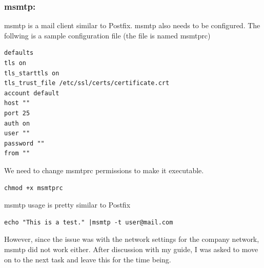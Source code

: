 \subsubsection{msmtp:} msmtp is a mail client similar to Postfix. msmtp also needs to be configured. The follwing is a sample configuration file (the file is named msmtprc) \cite{msmtp}

\begin{lstlisting}[style=ShellStyle]
defaults
tls on
tls_starttls on
tls_trust_file /etc/ssl/certs/certificate.crt
account default
host ""
port 25
auth on
user ""
password ""
from ""
\end{lstlisting}
We need to change msmtprc permissions to make it executable.
\begin{lstlisting}[style=ShellStyle]
chmod +x msmtprc
\end{lstlisting}
msmtp usage is pretty similar to Postfix 
\begin{lstlisting}[style=ShellStyle]
echo "This is a test." |msmtp -t user@mail.com
\end{lstlisting}
However, since the issue was with the network settings for the company network, msmtp did not work either. After discussion with my guide, I was asked to move on to the next task and leave this for the time being.\\

